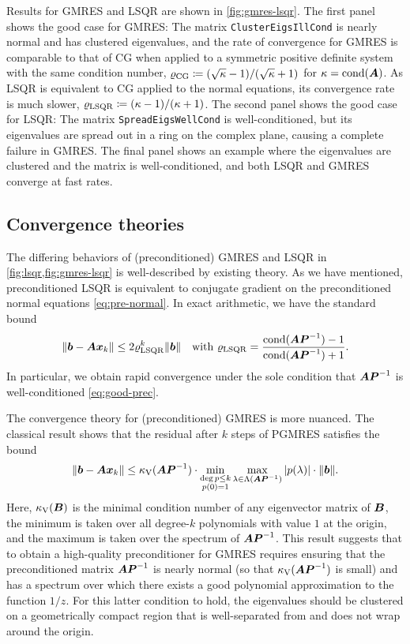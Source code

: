 \documentclass[onefignum,onetabnum,pagebackref,dvipsnames]{siamart220329}
\begin{document}
Results for GMRES and LSQR are shown in \cref{fig:gmres-lsqr}.
The first panel shows the good case for GMRES: The matrix \texttt{ClusterEigsIllCond} is nearly normal and has clustered eigenvalues, and the rate of convergence for GMRES is comparable to that of CG when applied to a symmetric positive definite system with the same condition number, $\varrho_{\rm CG} \coloneqq (\sqrt{\kappa} - 1)/(\sqrt{\kappa}+1)$ for $\kappa = \operatorname{cond}(\boldsymbol{A})$.
As LSQR is equivalent to CG applied to the normal equations, its convergence rate is much slower, $\varrho_{\rm LSQR} \coloneqq (\kappa-1)/(\kappa+1)$.
The second panel shows the good case for LSQR: The matrix \texttt{SpreadEigsWellCond} is well-conditioned, but its eigenvalues are spread out in a ring on the complex plane, causing a complete failure in GMRES.
The final panel shows an example where the eigenvalues are clustered and the matrix is well-conditioned, and both LSQR and GMRES  converge at fast rates.

\subsection{Convergence theories}

The differing behaviors of (preconditioned) GMRES and LSQR in \cref{fig:lsqr,fig:gmres-lsqr} is well-described by existing theory.
As we have mentioned, preconditioned LSQR is equivalent to conjugate gradient on the preconditioned normal equations \cref{eq:pre-normal}.
In exact arithmetic, we have the standard bound
%
\begin{equation} \label{eq:lsqr-conv}
    \norm{\vec{b} - \mat{A}\vec{x}_k} \le 2\varrho_{\rm LSQR}^k\norm{\vec{b}} \quad \text{with } \varrho_{\rm LSQR} = \frac{\cond(\mat{A}\mat{P}^{-1}) - 1}{\cond(\mat{A}\mat{P}^{-1}) + 1}.
\end{equation}
%
In particular, we obtain rapid convergence under the sole condition that $\boldsymbol{A}\boldsymbol{P}^{-1}$ is well-conditioned \cref{eq:good-prec}.

The convergence theory for (preconditioned) GMRES is more nuanced.
The classical result shows that the residual after $k$ steps of PGMRES satisfies the bound
%
\begin{equation} \label{eq:gmres-conv}
    \norm{\vec{b} - \mat{A}\vec{x}_k} \le \kappa_{\rm V}(\mat{A}\mat{P}^{-1}) \cdot \min_{\substack{\deg p \le k \\ p(0) = 1}} \max_{\lambda \in \Lambda(\mat{A}\mat{P}^{-1})} |p(\lambda)| \cdot \norm{\vec{b}}.
\end{equation}
%
Here, $\kappa_{\rm V}(\boldsymbol{B})$ is the minimal condition number of any eigenvector matrix of $\boldsymbol{B}$, the minimum is taken over all degree-$k$ polynomials with value $1$ at the origin, and the maximum is taken over the spectrum of $\boldsymbol{A}\boldsymbol{P}^{-1}$.
This result suggests that to obtain a high-quality preconditioner for GMRES requires ensuring that the preconditioned matrix $\boldsymbol{A}\boldsymbol{P}^{-1}$ is nearly normal (so that $\kappa_{\rm V}(\boldsymbol{A}\boldsymbol{P}^{-1})$ is small) and has a spectrum over which there exists a good polynomial approximation to the function $1/z$.
For this latter condition to hold, the eigenvalues should be clustered on a geometrically compact region that is well-separated from and does not wrap around the origin.
\end{document}
